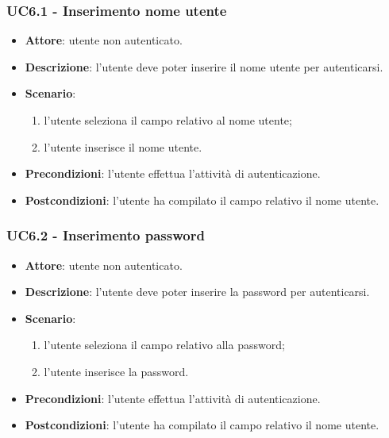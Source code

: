 \subsubsection{UC6.1 - Inserimento nome utente}
\begin{itemize}
    \item \textbf{Attore}: utente non autenticato.
    \item \textbf{Descrizione}: l'utente deve poter inserire il nome utente per autenticarsi.
    \item \textbf{Scenario}:
    \begin{enumerate}
        \item l'utente seleziona il campo relativo al nome utente;
        \item l'utente inserisce il nome utente.
    \end{enumerate}
    \item \textbf{Precondizioni}: l'utente effettua l'attività di autenticazione.
    \item \textbf{Postcondizioni}: l'utente ha compilato il campo relativo il nome utente.
\end{itemize}

\subsubsection{UC6.2 - Inserimento password}
\begin{itemize}
    \item \textbf{Attore}: utente non autenticato.
    \item \textbf{Descrizione}: l'utente deve poter inserire la password per autenticarsi.
    \item \textbf{Scenario}:
    \begin{enumerate}
        \item l'utente seleziona il campo relativo alla password;
        \item l'utente inserisce la password.
    \end{enumerate}

    \item \textbf{Precondizioni}: l'utente effettua l'attività di autenticazione.
    \item \textbf{Postcondizioni}: l'utente ha compilato il campo relativo il nome utente.
\end{itemize}

